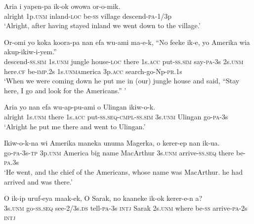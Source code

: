 {\ea\label{ex:a:x104}
\gll  Aria  i  yapen-pa  ik-ok  owowa  or-o-mik. \\
alright  1p.\textsc{unm}  inland-\textsc{loc}  be-\textsc{ss}  village  descend-\textsc{pa}-1/3p \\
\glt ‘Alright, after having stayed inland we went down to the village.’ \\
\z


\ea\label{ex:a:x105}
\gll  Or-omi  yo  koka  koora-pa  nan  efa               wu-ami  ma-e-k,  “No  feeke  ik-e,  yo  Amerika                   wia  akup-ikiw-i-yem.” \\
descend-\textsc{ss}.\textsc{sim}  1s.\textsc{unm}  jungle  house-\textsc{loc}  there  1s.\textsc{acc} put-\textsc{ss}.\textsc{sim}  say-\textsc{pa}-3s  2s.\textsc{unm}  here.\textsc{cf}  be-\textsc{imp}.2s  1s.\textsc{unma}merica  3p.\textsc{acc}  search-go-Np-\textsc{pr}.1s \\




\glt ‘When we were coming down he put me in (our) jungle house and said, “Stay here, I go and look for the Americans.” ’ \\
\z


\ea\label{ex:a:x106}
\gll  Aria  yo  nan  efa  wu-ap-pu-ami                  o  Ulingan  ikiw-o-k. \\
alright  1s.\textsc{unm}  there  1s.\textsc{acc}  put-\textsc{ss.seq}-\textsc{cmpl}-\textsc{ss}.\textsc{sim}  3s.\textsc{unm}  Ulingan  go-\textsc{pa}-3s \\


\glt ‘Alright he put me there and went to Ulingan.’ \\
\z


\ea\label{ex:a:x107}
\gll  Ikiw-o-k-na  wi  Amerika  maneka  unuma  Magerka,  o  kerer-ep  nan  ik-ua. \\
go-\textsc{pa}-3s-\textsc{tp}  3p.\textsc{unm}  America  big  name  MacArthur       3s.\textsc{unm}  arrive-\textsc{ss.seq}  there  be-\textsc{pa}.3s \\


\glt ‘He went, and the chief of the Americans, whose name was MacArthur. he had arrived and was there.’ \\
\z


\ea\label{ex:a:x108}
\gll  O  ik-ip  uruf-eya  maak-ek,  {\textquotedbl}O  Sarak,  no    kaaneke  ik-ok  kerer-e-n  a? \\
3s.\textsc{unm}  go-\textsc{ss.seq}  see-2/3s.\textsc{ds}  tell-\textsc{pa}-3s  \textsc{intj}  Sarak  2s.\textsc{unm}     where  be-\textsc{ss}  arrive-\textsc{pa}-2s  \textsc{intj} \\


}
